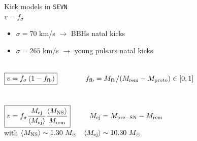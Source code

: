 \documentclass{beamer} %
\begin{document}
\begin{frame}[noframenumbering]{Kick models in \texttt{SEVN}}
		\small
		 \\
		\smallskip
		$\boxed{v = f_{\sigma}}$ \\
		\begin{itemize}
			\item $\sigma = 70$ km/s $\rightarrow$ BBHs natal kicks \\ 
			\item $\sigma = 265$ km/s $\rightarrow$ young pulsars natal kicks \\ 
		\end{itemize}
		\smallskip
		 \\
		\smallskip
		$\boxed{v = f_\sigma\,{} (1-f_{\rm fb})} \qquad \qquad f_{\rm fb}=M_{\rm fb}/(M_{\rm rem} - M_{\rm proto}) \in [0,1]$\\
		\\
		\medskip
		 \\
		\smallskip
		$\boxed{v = f_{\sigma} \frac{M_{\rm ej}}{\langle M_{\rm ej}\rangle} \frac{\langle M_{\rm NS}\rangle}{M_{\rm rem}}} \qquad ~~ M_{\rm ej} = M_{\rm pre-SN} - M_{\rm rem} $ \\ 
		\bigskip
		with $\langle M_{\rm NS}\rangle \sim 1.30~M_\odot \quad \langle M_{\rm ej}\rangle \sim 10.30 ~ M_\odot$ 
\end{frame}
\end{document}
